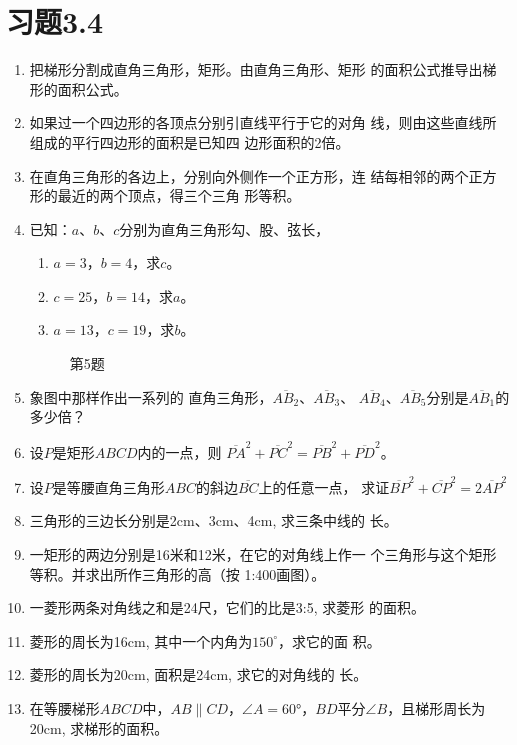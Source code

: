 \section*{习题3.4}
\begin{enumerate}
    \item 把梯形分割成直角三角形，矩形。由直角三角形、矩形
    的面积公式推导出梯形的面积公式。
    \item 如果过一个四边形的各顶点分别引直线平行于它的对角
    线，则由这些直线所组成的平行四边形的面积是已知四
    边形面积的2倍。
    \item 在直角三角形的各边上，分别向外侧作一个正方形，连
    结每相邻的两个正方形的最近的两个顶点，得三个三角
    形等积。
    \item 已知：$a$、$b$、$c$分别为直角三角形勾、股、弦长，
    \begin{enumerate}
        \item $a=3$，$b=4$，求$c$。
        \item $c=25$，$b=14$，求$a$。
     \item $a=13$，$c=19$，求$b$。
    \end{enumerate}

    \begin{figure}
    \centering
\begin{tikzpicture}[scale=2]
\end{tikzpicture}    
    \caption*{第5题}
\end{figure}

\item 象图中那样作出一系列的
直角三角形，$\overline{AB_2}$、$\overline{AB_3}$、
$\overline{AB_4}$、$\overline{AB_5}$分别是$\overline{AB_1}$的
多少倍？
\item 设$P$是矩形$ABCD$内的一点，则
$\overline{PA}^2+\overline{PC}^2=\overline{PB}^2+\overline{PD}^2$。

\item 设$P$是等腰直角三角形$ABC$的斜边$\overline{BC}$上的任意一点，
求证$\overline{BP}^2+\overline{CP}^2=2\overline{AP}^2$
\item 三角形的三边长分别是2cm、3cm、4cm, 求三条中线的
长。
\item 一矩形的两边分别是16米和12米，在它的对角线上作一
个三角形与这个矩形等积。并求出所作三角形的高（按
1:400画图）。
\item 一菱形两条对角线之和是24尺，它们的比是3:5, 求菱形
的面积。
\item 菱形的周长为16cm, 其中一个内角为$150^{\circ}$，求它的面
积。
\item 菱形的周长为20cm, 面积是24cm, 求它的对角线的
长。
\item 在等腰梯形$ABCD$中，$AB\parallel CD$，$\angle A=\ang{60}$，$BD$平分$\angle B$，且梯形周长为20cm, 求梯形的面积。
\end{enumerate}

